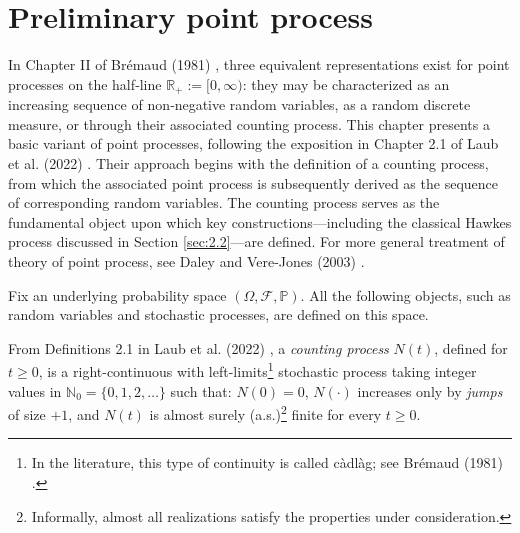 \documentclass[12pt,a4paper]{report}
\theoremstyle{plain}
\theoremstyle{definition}
\theoremstyle{remark}
\newcommand{\1}{\mathbf{1}}
\begin{document}
\section{Preliminary point process}\label{sec:2.1}
In Chapter II of Brémaud (1981) \cite{Bre81}, three equivalent representations exist for point processes on the half‑line $\mathbb{R}_+ := [0,\infty)$: they may be characterized as an increasing sequence of non‑negative random variables, as a random discrete measure, or through their associated counting process.
This chapter presents a basic variant of point processes, following the exposition in Chapter 2.1 of Laub et al. (2022) \cite{LLT22}. Their approach begins with the definition of a counting process, from which the associated point process is subsequently derived as the sequence of corresponding random variables. The counting process serves as the fundamental object upon which key constructions—including the classical Hawkes process discussed in Section \ref{sec:2.2}—are defined. For more general treatment of theory of point process, see Daley and Vere-Jones (2003) \cite{DVJ03}.

\medskip
\noindent
Fix an underlying probability space $(\Omega, \mathcal{F}, \mathbb{P})$. All the following objects, such as random variables and stochastic processes, are defined on this space.

\medskip
\noindent
From Definitions 2.1 in Laub et al. (2022) \cite{LLT22}, a \emph{counting process} $N(t)$, defined for $t\ge0$, is a right-continuous with left-limits\footnote{In the literature, this type of continuity is called c\`adl\`ag; see Br\'emaud (1981) \cite{Bre81}.} stochastic process taking integer values in $\mathbb{N}_0 = \{0, 1, 2, \dots\}$ such that: $N(0)=0$, $N(\cdot)$ increases only by \emph{jumps} of size $+1$, and $N(t)$ is almost surely (a.s.)\footnote{Informally, almost all realizations satisfy the properties under consideration.} finite for every $t\ge0$.
\end{document}
